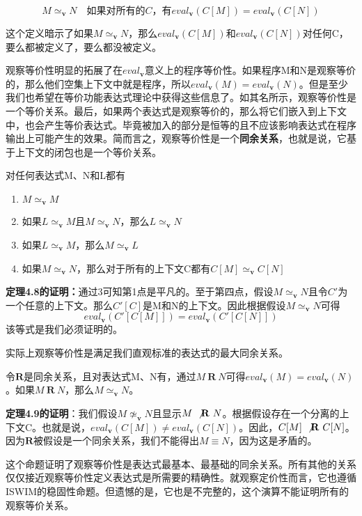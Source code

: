 \documentclass{book}
\def\v{\mathbf{v}}
\def\R{\mathbf{R}}
\begin{document}
\begin{framed}
 $$
 M\simeq_\v N\quad \text{如果对所有的$C$，有}eval_\v(C[M])=eval_\v(C[N])
 $$
\end{framed}
这个定义暗示了如果$M\simeq_\v N$，那么$eval_\v(C[M])$和$eval_\v(C[N])$对任何C，要么都被定义了，要么都没被定义。\par
观察等价性明显的拓展了在$eval_\v$意义上的程序等价性。如果程序M和N是观察等价的，那么他们空集上下文中就是程序，所以$eval_\v(M)=eval_\v(N)$。但是至少我们也希望在等价功能表达式理论中获得这些信息了。如其名所示，观察等价性是一个等价关系。最后，如果两个表达式是观察等价的，那么将它们嵌入到上下文中，也会产生等价表达式。毕竟被加入的部分是恒等的且不应该影响表达式在程序输出上可能产生的效果。简而言之，观察等价性是一个\textbf{同余关系}，也就是说，它基于上下文的闭包也是一个等价关系。
\begin{Theorem}
 对任何表达式M、N和L都有
 \begin{enumerate}
  \item $M\simeq_\v M$
  \item 如果$L\simeq_\v M$且$M\simeq_\v N$，那么$L\simeq_\v N$
  \item 如果$L\simeq_\v M$，那么$M\simeq_\v L$
  \item 如果$M\simeq_\v N$，那么对于所有的上下文C都有$C[M]\simeq_\v C[N]$
 \end{enumerate}
\end{Theorem}
\begin{adjustwidth}{20pt}{20pt}
 \textbf{定理4.8的证明：}通过3可知第1点是平凡的。至于第四点，假设$M\simeq_\v N$且令$C'$为一个任意的上下文。那么$C'[C]$是M和N的上下文。因此根据假设$M\simeq_\v N$可得
 $$
 eval_\v(C'[C[M]]) = eval_\v(C'[C[N]])
 $$
 该等式是我们必须证明的。
\end{adjustwidth}
实际上观察等价性是满足我们直观标准的表达式的最大同余关系。
\begin{Theorem}
 令$\R$是同余关系，且对表达式M、N有，通过$M\ \R\ N$可得$eval_\v(M)=eval_\v(N)$。如果$M\ \R\ N$，那么$M\simeq_\v N$。
\end{Theorem}
\begin{adjustwidth}{20pt}{20pt}
 \textbf{定理4.9的证明}：我们假设$M\not\simeq_\v N$且显示$M\ \not\R\ N$。根据假设存在一个分离的上下文C。也就是说，$eval_\v(C[M])\neq eval_\v(C[N])$。因此，$C[M]\ \not\R\ C[N]$。因为$\R$被假设是一个同余关系，我们不能得出$M\equiv N$，因为这是矛盾的。
\end{adjustwidth}
这个命题证明了观察等价性是表达式最基本、最基础的同余关系。所有其他的关系仅仅接近观察等价性定义表达式是所需要的精确性。就观察定价性而言，它也遵循ISWIM的稳固性命题。但遗憾的是，它也是不完整的，这个演算不能证明所有的观察等价关系。
\end{document}

